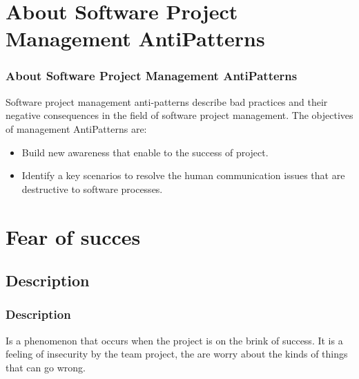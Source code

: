 \documentclass{beamer}
\begin{document}
\section{About Software Project Management AntiPatterns}
\begin{frame}
\frametitle{About Software Project Management AntiPatterns}
Software project management anti-patterns describe bad practices and their negative consequences in the field of software project management. The objectives of management AntiPatterns are:\\
\begin{itemize}
\item Build new awareness that enable to the success of project.
\item Identify a key scenarios to resolve the  human communication issues that are destructive to software processes.
\end{itemize}
\end{frame}
\section{Fear of succes}
\subsection{Description}
\begin{frame}
\frametitle{Description}
Is a phenomenon that occurs when the project is on the brink of success. It is a feeling of insecurity by the team project, the are worry about the kinds of things that can go wrong.
\end{frame}
\end{document}
